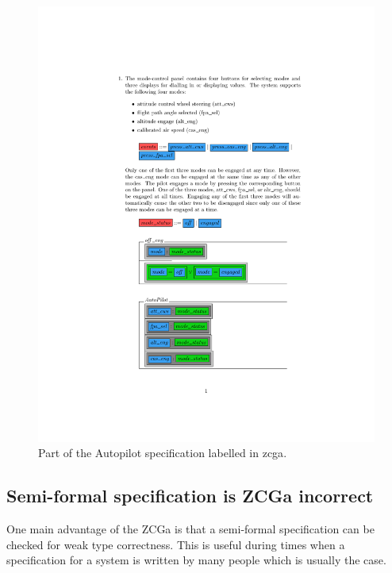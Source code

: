 \begin{figure}[H]
\centering
\includegraphics[clip, trim=3.5cm 10cm 1.5cm 2cm, scale=0.6]{examples/semiform/1.pdf}
\caption{Part of the Autopilot specification labelled in \gls{zcga}. \label{fig:zcgautopilot}}
\end{figure}

\subsection{Semi-formal specification is ZCGa incorrect}

One main advantage of the ZCGa is that a semi-formal specification
can be checked for weak type correctness. This is useful during times when a
specification for a system is written by many people which is usually the case.

